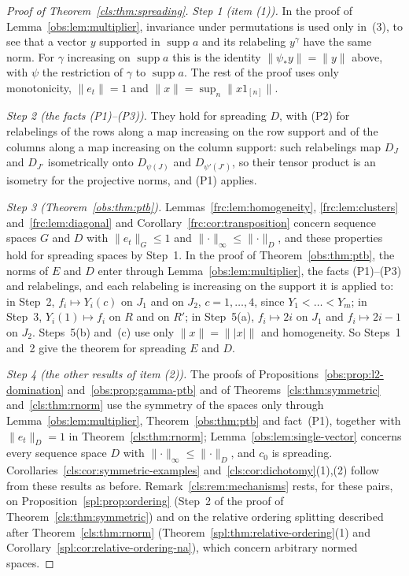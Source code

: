 \documentclass[11pt]{amsart}
\theoremstyle{definition}
\theoremstyle{remark}
\numberwithin{equation}{section}
\newcommand{\abs}[1]{\lvert #1\rvert}
\newcommand{\norm}[1]{\lVert #1\rVert}
\theoremstyle{plain}
\theoremstyle{definition}
\theoremstyle{plain}
\begin{document}
\begin{proof}[Proof of Theorem~\ref{cls:thm:spreading}]
\emph{Step 1 (item (1)).} In the proof of Lemma~\ref{obs:lem:multiplier}, invariance under permutations is used only
in~(3), to see that a vector $y$ supported in $\operatorname{supp}a$ and its relabeling $y^\gamma$ have the same norm.
For $\gamma$ increasing on $\operatorname{supp}a$ this is the identity $\norm{\psi_*y}=\norm y$ above, with $\psi$ the
restriction of $\gamma$ to $\operatorname{supp}a$. The rest of the proof uses only monotonicity, $\norm{e_t}=1$ and
$\norm x=\sup_n\norm{x1_{[n]}}$.

\emph{Step 2 (the facts (P1)--(P3)).} They hold for spreading $D$, with (P2) for relabelings of the rows along a map
increasing on the row support and of the columns along a map increasing on the column support: such relabelings map
$D_J$ and $D_{J'}$ isometrically onto $D_{\psi(J)}$ and $D_{\psi'(J')}$, so their tensor product is an isometry for the
projective norms, and (P1) applies.

\emph{Step 3 (Theorem~\ref{obs:thm:ptb}).} Lemmas~\ref{frc:lem:homogeneity}, \ref{frc:lem:clusters}
and~\ref{frc:lem:diagonal} and Corollary~\ref{frc:cor:transposition} concern sequence spaces $G$ and $D$ with
$\norm{e_t}_G\le1$ and $\norm\cdot_\infty\le\norm\cdot_D$, and these properties hold for spreading spaces by Step~1. In
the proof of Theorem~\ref{obs:thm:ptb}, the norms of $E$ and $D$ enter through Lemma~\ref{obs:lem:multiplier}, the facts
(P1)--(P3) and relabelings, and each relabeling is increasing on the support it is applied to: in Step~2, $f_i\mapsto
Y_i(c)$ on $J_1$ and on $J_2$, $c=1,\dots,4$, since $Y_1<\dots<Y_m$; in Step~3, $Y_i(1)\mapsto f_i$ on $R$ and on $R'$; in
Step~5(a), $f_i\mapsto2i$ on $J_1$ and $f_i\mapsto2i-1$ on $J_2$. Steps~5(b) and~(c) use only $\norm x=\norm{\abs x}$ and
homogeneity. So Steps~1 and~2 give the theorem for spreading $E$ and $D$.

\emph{Step 4 (the other results of item (2)).} The proofs of Propositions~\ref{obs:prop:l2-domination}
and~\ref{obs:prop:gamma-ptb} and of Theorems~\ref{cls:thm:symmetric} and~\ref{cls:thm:rnorm} use the symmetry of the
spaces only through Lemma~\ref{obs:lem:multiplier}, Theorem~\ref{obs:thm:ptb} and fact~(P1), together with
$\norm{e_t}_D=1$ in Theorem~\ref{cls:thm:rnorm}; Lemma~\ref{obs:lem:single-vector} concerns every sequence space $D$ with
$\norm\cdot_\infty\le\norm\cdot_D$, and $c_0$ is spreading. Corollaries~\ref{cls:cor:symmetric-examples}
and~\ref{cls:cor:dichotomy}(1),(2) follow from these results as before. Remark~\ref{cls:rem:mechanisms} rests, for these
pairs, on Proposition~\ref{spl:prop:ordering} (Step~2 of the proof of Theorem~\ref{cls:thm:symmetric}) and on the
relative ordering splitting described after Theorem~\ref{cls:thm:rnorm} (Theorem~\ref{spl:thm:relative-ordering}(1) and
Corollary~\ref{spl:cor:relative-ordering-na}), which concern arbitrary normed spaces.


\end{proof}
\end{document}
